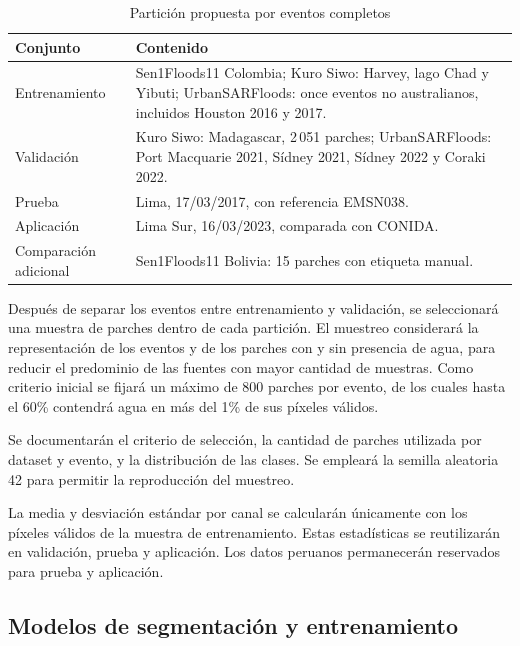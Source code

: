 \documentclass[conference]{IEEEtran}
\begin{document}
\begin{table}[!t]
\centering
\caption{Partición propuesta por eventos completos}
\label{tab:particion}
\footnotesize
\renewcommand{\arraystretch}{1.2}
\begin{tabular}{
@{}p{}
p{}@{}
}
\hline
\textbf{Conjunto} & \textbf{Contenido} \\
\hline

Entrenamiento &
Sen1Floods11 Colombia; Kuro Siwo:
Harvey, lago Chad y Yibuti;
UrbanSARFloods: once eventos no australianos,
incluidos Houston 2016 y 2017. \\

Validación &
Kuro Siwo: Madagascar, 2\,051 parches;
UrbanSARFloods: Port Macquarie 2021,
Sídney 2021, Sídney 2022 y Coraki 2022. \\

Prueba &
Lima, 17/03/2017, con referencia EMSN038. \\

Aplicación &
Lima Sur, 16/03/2023, comparada con CONIDA. \\

Comparación adicional &
Sen1Floods11 Bolivia:
15 parches con etiqueta manual. \\

\hline
\end{tabular}
\end{table}

Después de separar los eventos entre entrenamiento
y validación, se seleccionará una muestra de
parches dentro de cada partición. El muestreo
considerará la representación de los eventos
y de los parches con y sin presencia de agua,
para reducir el predominio de las fuentes
con mayor cantidad de muestras. Como criterio
inicial se fijará un máximo de 800 parches
por evento, de los cuales hasta el 60\%
contendrá agua en más del 1\% de sus píxeles
válidos.

Se documentarán el criterio de selección,
la cantidad de parches utilizada por dataset
y evento, y la distribución de las clases.
Se empleará la semilla aleatoria 42 para
permitir la reproducción del muestreo.

La media y desviación estándar por canal
se calcularán únicamente con los píxeles
válidos de la muestra de entrenamiento.
Estas estadísticas se reutilizarán en
validación, prueba y aplicación.
Los datos peruanos permanecerán reservados
para prueba y aplicación.

\subsection{Modelos de segmentación y entrenamiento}
\label{subsec:modelos}
\end{document}
